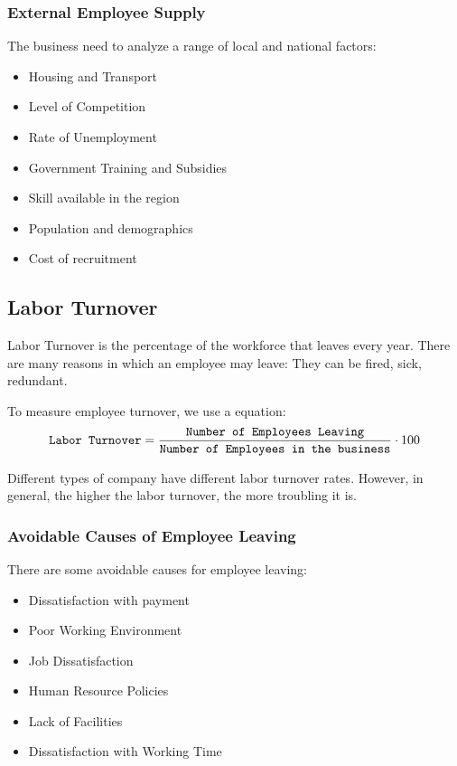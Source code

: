 \documentclass{standalone}
\begin{document}
\subsubsection{External Employee Supply}
The business need to analyze a range of local and national factors:
\begin{itemize}
	\item Housing and Transport
	\item Level of Competition
	\item Rate of Unemployment
	\item Government Training and Subsidies
	\item Skill available in the region
	\item Population and demographics
	\item Cost of recruitment
\end{itemize}

\subsection{Labor Turnover}\label{LaborTurnover}
Labor Turnover is the percentage of the workforce that leaves every year.
There are many reasons in which an employee may leave:
They can be fired, sick, redundant.

To measure employee turnover, we use a equation:
\begin{equation}
	\texttt{Labor Turnover} = \frac{\texttt{Number of Employees Leaving}}{ \texttt{Number of Employees in the business} } \cdot 100 \\
\end{equation}

Different types of company have different labor turnover rates. 
However, in general, the higher the labor turnover, the more troubling it is.

\subsubsection{Avoidable Causes of Employee Leaving}
There are some avoidable causes for employee leaving:
\begin{itemize}
	\item Dissatisfaction with payment
	\item Poor Working Environment
	\item Job Dissatisfaction
	\item Human Resource Policies
	\item Lack of Facilities
	\item Dissatisfaction with Working Time
\end{itemize}
\end{document}
